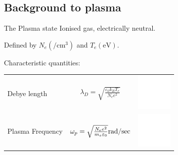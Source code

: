 \documentclass[dvipsnames]{beamer}
\begin{document}
\subsection{Background to plasma}
\begin{frame}{The Plasma state}
Ionised gas, electrically neutral.

Defined by $N_e\left(\si{\per\cubic\cm} \right)$ and $T_e\left(\si{\electronvolt} \right)$.

Characteristic quantities:
  \begin{tabular}{l c r}
  Debye length & $\lambda_D=\sqrt{\frac{\varepsilon_0 k_B T_e}{N_e e^2}}$ &  \includegraphics[height=50pt]{figures/theory/white_background.png}\\ 
  Plasma Frequency & $ \omega_p=\sqrt{\frac{N_e e^2}{m_e \varepsilon_0}}\si[per-mode=fraction]{\radian\per\sec} $ & \includegraphics[height=50pt]{figures/theory/white_background.png}\\
  \end{tabular}
\end{frame}
\end{document}
